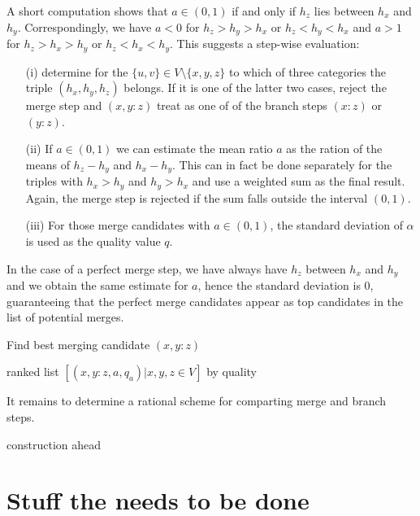 \documentclass{article}
\newcommand{\TODO}[1]{\begingroup\color{red}#1\endgroup}
\begin{document}
A short computation shows that $a\in(0,1)$ if and only if $h_z$ lies
between $h_x$ and $h_y$. Correspondingly, we have $a<0$ for $h_z>h_y>h_x$
or $h_z<h_y<h_x$ and $a>1$ for $h_z>h_x>h_y$ or $h_z<h_x<h_y$.  This
suggests a step-wise evaluation:
\begin{itemize} 
\item[(i)] determine for the $\{u,v\}\in V\setminus\{x,y,z\}$ to which of
  three categories the triple $(h_x,h_y,h_z)$ belongs. If it is one of the
  latter two cases, reject the merge step and $(x,y:z)$ treat as one of of
  the branch steps $(x:z)$ or $(y:z)$.
\item[(ii)] If $a\in(0,1)$ we can estimate the mean ratio $a$ as the ration
  of the means of $h_z-h_y$ and $h_x-h_y$. This can in fact be done
  separately for the triples with $h_x>h_y$ and $h_y>h_x$ and use a
  weighted sum as the final result. Again, the merge step is rejected if
  the sum falls outside the interval $(0,1)$. 
\item[(iii)] For those merge candidates with $a\in(0,1)$, the standard
  deviation of $\alpha$ is used as the quality value $q$.
\end{itemize}
In the case of a perfect merge step, we have always have $h_z$ between
$h_x$ and $h_y$ and we obtain the same estimate for $a$, hence the standard
deviation is $0$, guaranteeing that the perfect merge candidates appear as
top candidates in the list of potential merges.

\begin{algorithm}[H]
\caption{Find best merging candidate $(x,y:z)$ } 
\label{alg:mergestep}

\Return ranked list $[(x,y:z,a,q_a)| x,y,z\in V]$ by quality\;
\end{algorithm} 

It remains to determine a rational scheme for comparting merge and branch
steps.

\TODO{construction ahead} 

\section{Stuff the needs to be done} 
\end{document}
